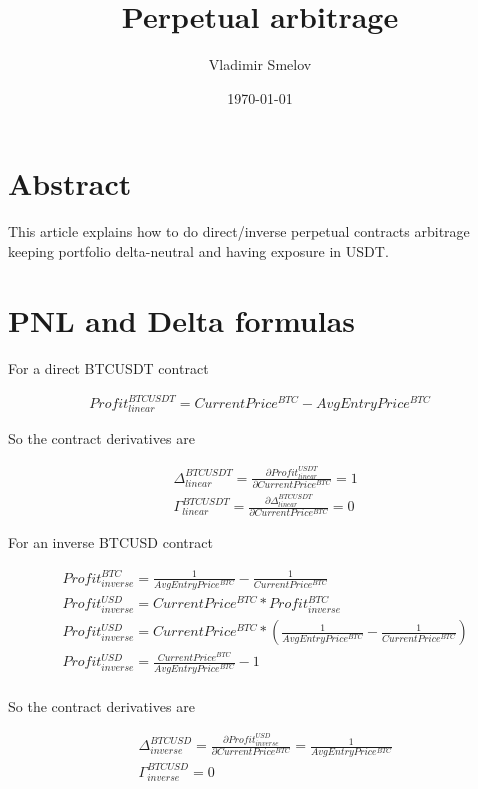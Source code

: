\documentclass{article}
\begin{document}
\title{Perpetual arbitrage}
\author{Vladimir Smelov}
\date{\today}
\maketitle

\section{Abstract}
This article explains how to do direct/inverse perpetual contracts arbitrage keeping portfolio delta-neutral and having exposure in USDT.

\section{PNL and Delta formulas}

For a direct BTCUSDT contract

\begin{align*}
Profit^{BTCUSDT}_{linear} = CurrentPrice^{BTC} - AvgEntryPrice^{BTC}
\end{align*}

So the contract derivatives are

\begin{align*}
& \Delta^{BTCUSDT}_{linear} = \frac{\partial Profit^{USDT}_{linear}}{\partial CurrentPrice^{BTC}} = 1 \\
& \Gamma^{BTCUSDT}_{linear} = \frac{\partial \Delta^{BTCUSDT}_{linear}}{\partial CurrentPrice^{BTC}} = 0
\end{align*}


For an inverse BTCUSD contract

\begin{align*}
& Profit^{BTC}_{inverse} = \frac{1}{AvgEntryPrice^{BTC}} - \frac{1}{CurrentPrice^{BTC}} \\
& Profit^{USD}_{inverse} = CurrentPrice^{BTC} * Profit^{BTC}_{inverse} \\
& Profit^{USD}_{inverse} = CurrentPrice^{BTC} * (\frac{1}{AvgEntryPrice^{BTC}} - \frac{1}{CurrentPrice^{BTC}}) \\
& Profit^{USD}_{inverse} = \frac{CurrentPrice^{BTC}}{AvgEntryPrice^{BTC}} - 1 \\
\end{align*}

So the contract derivatives are

\begin{align*}
& \Delta^{BTCUSD}_{inverse} = \frac{\partial Profit^{USD}_{inverse}}{\partial CurrentPrice^{BTC}} = \frac{1}{AvgEntryPrice^{BTC}} \\
& \Gamma^{BTCUSD}_{inverse} = 0
\end{align*}
\end{document}
